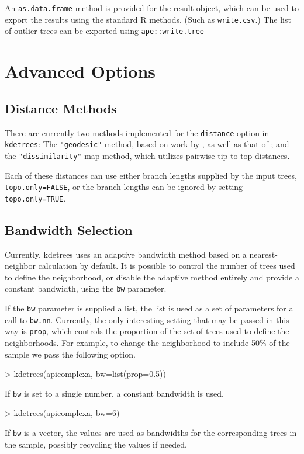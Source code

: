 \documentclass{article}
\begin{document}
  An {\tt as.data.frame} method is provided for the result object,
  which can be used to export the results using the standard R
  methods. (Such as {\tt write.csv}.) The list of outlier trees can be
  exported using {\tt ape::write.tree}
\begin{Schunk}
\end{Schunk}

\section{Advanced Options}
\label{sec:advanced-options}

\subsection{Distance Methods}
There are currently two methods implemented for the {\tt distance}
option in {\tt kdetrees}: The {\tt "geodesic"} method, based on work
by \citet{bhv}, as well as that of \citet{owen}; and the {\tt "dissimilarity"} map method, which utilizes
pairwise tip-to-top distances.

Each of these distances can use either branch lengths supplied by the
input trees, {\tt topo.only=FALSE}, or the branch lengths can be
ignored by setting {\tt topo.only=TRUE}.


\subsection{Bandwidth Selection}

Currently, kdetrees uses an adaptive bandwidth method based on a
nearest-neighbor calculation by default. It is possible to control the
number of trees used to define the neighborhood, or disable the
adaptive method entirely and provide a constant bandwidth, using the
{\tt bw} parameter. 

If the {\tt bw} parameter is supplied a list, the list is used as a
set of parameters for a call to {\tt bw.nn}. Currently, the only
interesting setting that may be passed in this way is {\tt prop},
which controls the proportion of the set of trees used to define the
neighborhoods. For example, to change the neighborhood to include 50\%
of the sample we pass the following option.
\begin{Schunk}
\begin{Sinput}
> kdetrees(apicomplexa, bw=list(prop=0.5))
\end{Sinput}
\end{Schunk}
If {\tt bw} is set to a single number, a constant bandwidth is used.
\begin{Schunk}
\begin{Sinput}
> kdetrees(apicomplexa, bw=6)
\end{Sinput}
\end{Schunk}
If {\tt bw} is a vector, the values are used as bandwidths for the
corresponding trees in the sample, possibly recycling the values if needed.
\end{document}
